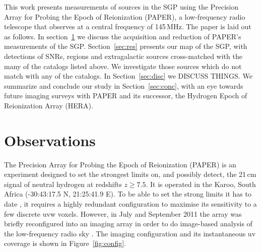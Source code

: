 \documentclass[preprint2,epsf,epsfig,graphics]{emulateapj}
\begin{document}
This work presents measurements of sources in the SGP using the Precision Array for Probing the Epoch of Reionization (PAPER), a low-frequency radio telescope that observes at a central frequency of 145\,MHz. The paper is laid out as follows. In section~\ref{sec:obs} we discuss the acquisition and reduction of PAPER's measurements of the SGP. Section~\ref{sec:res} presents our map of the SGP, with detections of SNRs,  regions and extragalactic sources cross-matched with the many of the catalogs listed above. We investigate those sources which do not match with any of the catalogs. In Section~\ref{sec:disc} we {\color{red} DISCUSS THINGS}. We summarize and conclude our study in Section~\ref{sec:conc}, with an eye towards future imaging surveys with PAPER and its successor, the Hydrogen Epoch of Reionization Array (HERA).

\section{Observations}
\label{sec:obs}

The Precision Array for Probing the Epoch of Reionization (PAPER) is an experiment designed to set the strongest limits on, and possibly detect, the 21\,cm signal of neutral hydrogen at redshifts $z \geq 7.5$. It is operated in the Karoo, South Africa (-30:43:17.5 N, 21:25:41.9 E). To be able to set the strong limits it has to date \citep[][Cheng et al. in prep., Kohn et al. in prep.?]{Parsons.14, Jacobs.14, Ali.15, Moore.15}, it requires a highly redundant configuration to maximise its sensitivity to a few discrete uvw voxels. However, in July and September 2011 the array was briefly reconfigured into an imaging array in order to do image-based analysis of the low-frequency radio sky \citep[e.g.][]{Stefan.13}. The imaging configuration and its instantaneous uv coverage is shown in Figure~\ref{fig:config}.
\end{document}
